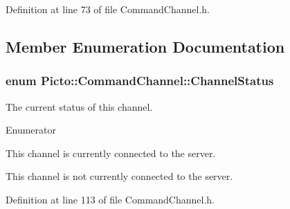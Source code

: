 Definition at line 73 of file Command\-Channel.\-h.



\subsection{Member Enumeration Documentation}
\hypertarget{class_picto_1_1_command_channel_ab7d91aac6340369c17e2bd2be8a465db}{
\subsubsection[{Channel\-Status}]{\setlength{\rightskip}{0pt plus 5cm}enum {\bf Picto\-::\-Command\-Channel\-::\-Channel\-Status}}}\label{class_picto_1_1_command_channel_ab7d91aac6340369c17e2bd2be8a465db}


The current status of this channel. 

\begin{Desc}
\item[Enumerator]\par
\begin{description}
\item[{\em 
\hypertarget{class_picto_1_1_command_channel_ab7d91aac6340369c17e2bd2be8a465dbacab8110f599c9fb57e044a328111b2c6}{connected}\label{class_picto_1_1_command_channel_ab7d91aac6340369c17e2bd2be8a465dbacab8110f599c9fb57e044a328111b2c6}
}]This channel is currently connected to the server. \item[{\em 
\hypertarget{class_picto_1_1_command_channel_ab7d91aac6340369c17e2bd2be8a465dbad0e2834ef8ac8d240b15e4f43b4bdc46}{disconnected}\label{class_picto_1_1_command_channel_ab7d91aac6340369c17e2bd2be8a465dbad0e2834ef8ac8d240b15e4f43b4bdc46}
}]This channel is not currently connected to the server. \end{description}
\end{Desc}


Definition at line 113 of file Command\-Channel.\-h.



